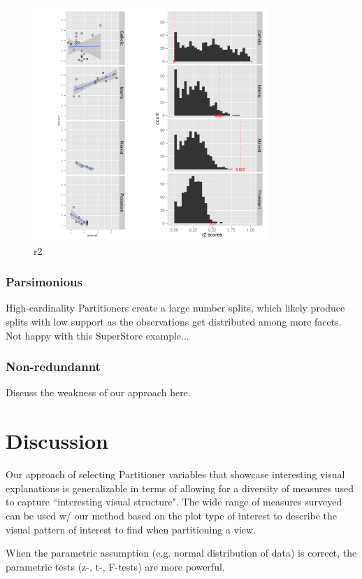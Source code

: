 \begin{figure}
\raggedleft
\includegraphics[width=3.5in,height=3.5in]{images/4_16075880239701-LEADER.pdf}
  \caption{r2}
 \label{fig:r2-leader}
\end{figure}

\subsubsection{Parsimonious}
High-cardinality Partitioners create a large number splits, which likely produce splits with low support as the observations get distributed among more facets. Not happy with this SuperStore example...

\subsubsection{Non-redundannt}
Discuss the weakness of our approach here.


\section{Discussion}
\label{sec:discussion}
Our approach of selecting Partitioner variables that showcase interesting visual explanations is generalizable in terms of allowing for a diversity of measures used to capture ``interesting visual structure". The wide range of measures surveyed~\cite{Bertini2011} can be used w/ our method based on the plot type of interest to describe the visual pattern of interest to find when partitioning a view.

When the parametric assumption (e.g. normal
distribution of data) is correct, the parametric
tests (z-, t-, F-tests) are more powerful.

